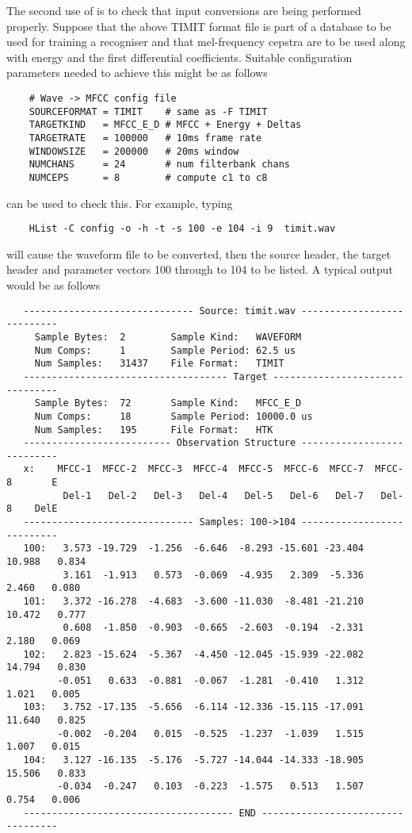The second use of  is to check that input conversions
are being performed properly.  Suppose that the above TIMIT format file is
part of a database to be used for training a recogniser and that mel-frequency
cepstra are to be used along with energy and the first differential coefficients.
Suitable configuration parameters needed to achieve this might be as follows
\begin{verbatim}
    # Wave -> MFCC config file
    SOURCEFORMAT = TIMIT    # same as -F TIMIT
    TARGETKIND   = MFCC_E_D # MFCC + Energy + Deltas
    TARGETRATE   = 100000   # 10ms frame rate
    WINDOWSIZE   = 200000   # 20ms window
    NUMCHANS     = 24       # num filterbank chans
    NUMCEPS      = 8        # compute c1 to c8
\end{verbatim}
 can be used to check this.  For example, typing
\begin{verbatim}
    HList -C config -o -h -t -s 100 -e 104 -i 9  timit.wav
\end{verbatim}
will cause the waveform file to be converted, then the source header, 
the target header and parameter vectors 100 through to 104 to be listed.
A typical output would be as follows
\begin{verbatim}
   ------------------------------ Source: timit.wav ---------------------------
     Sample Bytes:  2        Sample Kind:   WAVEFORM
     Num Comps:     1        Sample Period: 62.5 us
     Num Samples:   31437    File Format:   TIMIT
   ------------------------------------ Target --------------------------------
     Sample Bytes:  72       Sample Kind:   MFCC_E_D
     Num Comps:     18       Sample Period: 10000.0 us
     Num Samples:   195      File Format:   HTK
   -------------------------- Observation Structure ---------------------------
   x:    MFCC-1  MFCC-2  MFCC-3  MFCC-4  MFCC-5  MFCC-6  MFCC-7  MFCC-8       E
          Del-1   Del-2   Del-3   Del-4   Del-5   Del-6   Del-7   Del-8    DelE
   ------------------------------ Samples: 100->104 ---------------------------
   100:   3.573 -19.729  -1.256  -6.646  -8.293 -15.601 -23.404  10.988   0.834
          3.161  -1.913   0.573  -0.069  -4.935   2.309  -5.336   2.460   0.080
   101:   3.372 -16.278  -4.683  -3.600 -11.030  -8.481 -21.210  10.472   0.777
          0.608  -1.850  -0.903  -0.665  -2.603  -0.194  -2.331   2.180   0.069
   102:   2.823 -15.624  -5.367  -4.450 -12.045 -15.939 -22.082  14.794   0.830
         -0.051   0.633  -0.881  -0.067  -1.281  -0.410   1.312   1.021   0.005
   103:   3.752 -17.135  -5.656  -6.114 -12.336 -15.115 -17.091  11.640   0.825
         -0.002  -0.204   0.015  -0.525  -1.237  -1.039   1.515   1.007   0.015
   104:   3.127 -16.135  -5.176  -5.727 -14.044 -14.333 -18.905  15.506   0.833
         -0.034  -0.247   0.103  -0.223  -1.575   0.513   1.507   0.754   0.006
   ------------------------------------- END ----------------------------------
\end{verbatim}

